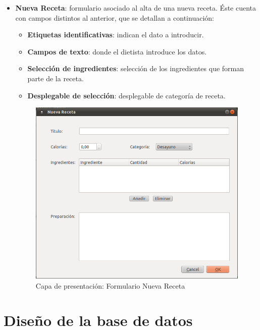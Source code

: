 \begin{itemize}
\item \textbf{Nueva Receta}: formulario asociado al alta de una nueva receta. Éste cuenta con campos distintos al anterior, que se detallan a continuación:
\begin{itemize}
\item \textbf{Etiquetas identificativas}: indican el dato a introducir.
\item \textbf{Campos de texto}: donde el dietista introduce los datos.
\item \textbf{Selección de ingredientes}: selección de los ingredientes que forman parte de la receta.
\item \textbf{Desplegable de selección}: desplegable de categoría de receta.
\end{itemize}
\begin{figure}[H]
  \label{nreceta}
  \begin{center}
    \includegraphics[scale=0.5]{../../Image/receta-nueva.png}
  \end{center}
  \caption{Capa de presentación: Formulario Nueva Receta}
\end{figure}
\end{itemize}

\section{Diseño de la base de datos}
